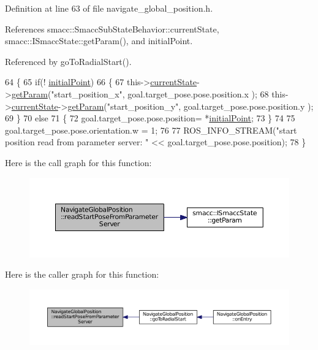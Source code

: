 Definition at line 63 of file navigate\+\_\+global\+\_\+position.\+h.



References smacc\+::\+Smacc\+Sub\+State\+Behavior\+::current\+State, smacc\+::\+I\+Smacc\+State\+::get\+Param(), and initial\+Point.



Referenced by go\+To\+Radial\+Start().


\begin{DoxyCode}
64   \{
65     \textcolor{keywordflow}{if}(! \hyperlink{classNavigateGlobalPosition_a3b8beafc64a18063c86228b6c497102b}{initialPoint})
66     \{
67       this->\hyperlink{classsmacc_1_1SmaccSubStateBehavior_a62e2b9da4a446f09396d0b4c01659b88}{currentState}->\hyperlink{classsmacc_1_1ISmaccState_abbb3a24b912c6e8de28f7b86123b6357}{getParam}(\textcolor{stringliteral}{"start\_position\_x"}, goal.target\_pose.pose.position.x
      );
68       this->\hyperlink{classsmacc_1_1SmaccSubStateBehavior_a62e2b9da4a446f09396d0b4c01659b88}{currentState}->\hyperlink{classsmacc_1_1ISmaccState_abbb3a24b912c6e8de28f7b86123b6357}{getParam}(\textcolor{stringliteral}{"start\_position\_y"}, goal.target\_pose.pose.position.y
      );
69     \}
70     \textcolor{keywordflow}{else}
71     \{
72       goal.target\_pose.pose.position= *\hyperlink{classNavigateGlobalPosition_a3b8beafc64a18063c86228b6c497102b}{initialPoint};
73     \}
74     
75     goal.target\_pose.pose.orientation.w = 1;
76 
77     ROS\_INFO\_STREAM(\textcolor{stringliteral}{"start position read from parameter server: "} << goal.target\_pose.pose.position);
78   \}
\end{DoxyCode}


Here is the call graph for this function\+:
\nopagebreak
\begin{figure}[H]
\begin{center}
\leavevmode
\includegraphics[width=350pt]{classNavigateGlobalPosition_a7f59ee188413d4f4b006549ba6d3d3f8_cgraph}
\end{center}
\end{figure}




Here is the caller graph for this function\+:
\nopagebreak
\begin{figure}[H]
\begin{center}
\leavevmode
\includegraphics[width=350pt]{classNavigateGlobalPosition_a7f59ee188413d4f4b006549ba6d3d3f8_icgraph}
\end{center}
\end{figure}




